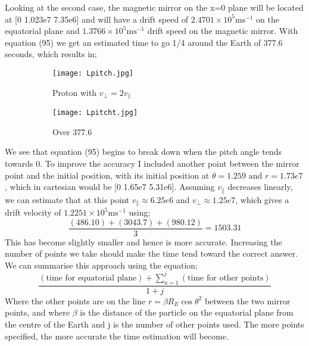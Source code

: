 \documentclass[14paper,11pt,hidelinks]{article}
\begin{document}
Looking at the second case, the magnetic mirror on the x=0 plane will be located at [0 1.023e7 7.35e6] and will have a drift speed of \begin{math}2.4701\times 10^5\mbox{ms}^{-1}\end{math} on the equatorial plane and \begin{math}1.3766\times10^5\mbox{ms}^{-1}\end{math} drift speed on the magnetic mirror. With equation (95) we get an estimated time to go 1/4 around the Earth of 377.6 seconds, which results in;
\begin{figure}[h!]
\centering
\begin{subfigure}[b]{0.3\linewidth}
\texttt{[image: Lpitch.jpg]} 
\caption*{Proton with $v_\bot=2v_\parallel$}
\end{subfigure}
\begin{subfigure}[b]{0.3\linewidth}
\texttt{[image: Lpitcht.jpg]}
\caption*{Over 377.6}
\end{subfigure}
\caption{}
\end{figure}
\FloatBarrier 
\noindent
We see that equation (95) begins to break down when the pitch angle tends towards 0. To improve the accuracy I included another point between the mirror point and the initial position, with its initial position at \begin{math} \theta=1.259 \mbox{ and } r=1.73e7\end{math}, which in cartesian would be [0 1.65e7 5.31e6]. Assuming \begin{math}v_\parallel\end{math} decreases linearly, we can estimate that at this point \begin{math} v_\parallel\approx6.25e6\end{math} and \begin{math}v_\bot\approx1.25e7\end{math}, which gives a drift velocity of \begin{math}1.2251\times10^5\mbox{ms}^{-1} \end{math} using;
\begin{equation}
\frac{( 486.10)+(3043.7)+(980.12)}{3}=1503.31
\end{equation} 
This has become slightly smaller and hence is more accurate. Increasing the number of points we take should make the time tend toward the correct answer. We can summarise this approach using the equation;
\begin{equation}
\frac{(\mbox{time for equatorial plane})+\sum_{n=1}^{j} (\mbox{time for other points})}{1+j}
\end{equation}
Where the other points are on the line \begin{math}r=\beta R_E\cos\theta^2\end{math} between the two mirror points, and where \begin{math}\beta\end{math} is the distance of the particle on the equatorial plane from the centre of the Earth and j is the number of other points used. The more points specified, the more accurate the time estimation will become. 
\end{document}
